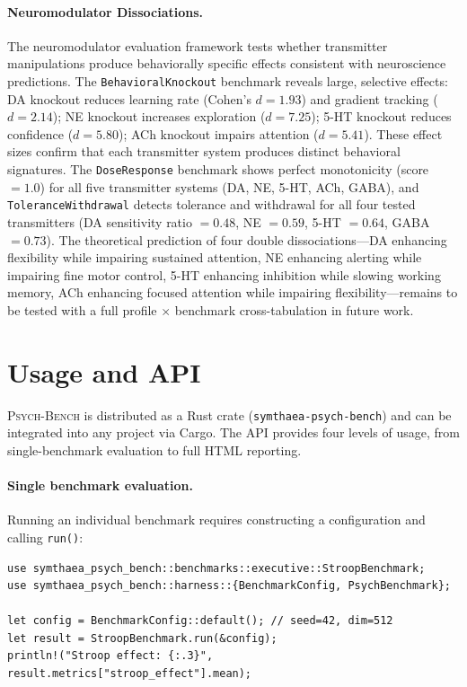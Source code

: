 \documentclass[11pt,letterpaper]{article}
\newcommand{\psychbench}{\textsc{Psych-Bench}}
\begin{document}
\paragraph{Neuromodulator Dissociations.} The neuromodulator evaluation framework tests whether transmitter manipulations produce behaviorally specific effects consistent with neuroscience predictions. The \texttt{BehavioralKnockout} benchmark reveals large, selective effects: DA knockout reduces learning rate (Cohen's $d = 1.93$) and gradient tracking ($d = 2.14$); NE knockout increases exploration ($d = 7.25$); 5-HT knockout reduces confidence ($d = 5.80$); ACh knockout impairs attention ($d = 5.41$). These effect sizes confirm that each transmitter system produces distinct behavioral signatures. The \texttt{DoseResponse} benchmark shows perfect monotonicity (score $= 1.0$) for all five transmitter systems (DA, NE, 5-HT, ACh, GABA), and \texttt{ToleranceWithdrawal} detects tolerance and withdrawal for all four tested transmitters (DA sensitivity ratio $= 0.48$, NE $= 0.59$, 5-HT $= 0.64$, GABA $= 0.73$). The theoretical prediction of four double dissociations---DA enhancing flexibility while impairing sustained attention, NE enhancing alerting while impairing fine motor control, 5-HT enhancing inhibition while slowing working memory, ACh enhancing focused attention while impairing flexibility---remains to be tested with a full profile $\times$ benchmark cross-tabulation in future work.

\section{Usage and API}
\label{sec:usage}

\psychbench{} is distributed as a Rust crate (\texttt{symthaea-psych-bench}) and can be integrated into any project via Cargo. The API provides four levels of usage, from single-benchmark evaluation to full HTML reporting.

\paragraph{Single benchmark evaluation.} Running an individual benchmark requires constructing a configuration and calling \texttt{run()}:

\begin{lstlisting}
use symthaea_psych_bench::benchmarks::executive::StroopBenchmark;
use symthaea_psych_bench::harness::{BenchmarkConfig, PsychBenchmark};

let config = BenchmarkConfig::default(); // seed=42, dim=512
let result = StroopBenchmark.run(&config);
println!("Stroop effect: {:.3}", result.metrics["stroop_effect"].mean);
\end{lstlisting}
\end{document}
